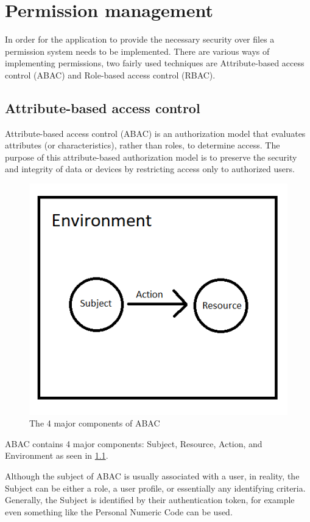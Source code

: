 \chapter{Permission management}
\label{chap:ch1}

In order for the application to provide the necessary security over files a permission system
needs to be implemented. There are various ways of implementing permissions, two fairly used 
techniques are Attribute-based access control (ABAC) and Role-based access control (RBAC).
\section{Attribute-based access control}
Attribute-based access control (ABAC) is an authorization model that evaluates attributes 
(or characteristics), rather than roles, to determine access.\cite{keithABAC} The purpose of this 
attribute-based authorization model is to preserve the security and integrity of data 
or devices by restricting access only to authorized users. 

\begin{figure}[htbp]
	\centering
		\includegraphics[scale=0.65]{./figures/chapter3/abac.png}
	\caption{The 4 major components of ABAC}
	\label{FigABAC}
\end{figure}


ABAC contains 4 major components: Subject, Resource, Action, and Environment as seen in \ref{FigABAC}.

Although the subject of ABAC is usually associated with a user, in reality,
the Subject can be either a role, a user profile, or essentially any identifying
criteria. Generally, the Subject is identified by their authentication token, 
for example even something like the Personal Numeric Code can be used. 

